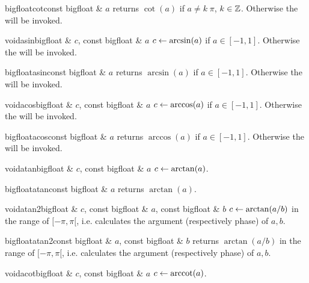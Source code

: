 \begin{fcode}{bigfloat}{cot}{const bigfloat & $a$}
  returns $\cot(a)$ if $a \neq k\;\pi$, $k \in \mathbb{Z}$.  Otherwise the \LEH will be invoked.
\end{fcode}

\begin{fcode}{void}{asin}{bigfloat & $c$, const bigfloat & $a$}
  $c \leftarrow \arcsin(a)$ if $a \in [ -1, 1 ] $.  Otherwise the \LEH will be invoked.
\end{fcode}

\begin{fcode}{bigfloat}{asin}{const bigfloat & $a$}
  returns $\arcsin(a)$ if $a \in [ -1, 1 ]$.  Otherwise the \LEH will be invoked.
\end{fcode}


\begin{fcode}{void}{acos}{bigfloat & $c$, const bigfloat & $a$}
  $c \leftarrow \arccos(a)$ if $a \in [ -1, 1 ]$.  Otherwise the \LEH will be invoked.
\end{fcode}

\begin{fcode}{bigfloat}{acos}{const bigfloat & $a$}
  returns $\arccos(a)$ if $a \in [ -1, 1 ]$.  Otherwise the \LEH will be invoked.
\end{fcode}

\begin{fcode}{void}{atan}{bigfloat & $c$, const bigfloat & $a$}
  $c \leftarrow \arctan(a)$.
\end{fcode}

\begin{fcode}{bigfloat}{atan}{const bigfloat & $a$}
  returns $\arctan(a)$.
\end{fcode}

\begin{fcode}{void}{atan2}{bigfloat & $c$, const bigfloat & $a$, const bigfloat & $b$}
  $c \leftarrow \arctan(a / b)$ in the range of $[-\pi, \pi[$, i.e. 
  calculates the argument (respectively phase) of $a, b$.
\end{fcode}

\begin{fcode}{bigfloat}{atan2}{const bigfloat & $a$, const bigfloat & $b$}
  returns $\arctan(a / b)$ in the range of $[-\pi, \pi[$, i.e.  calculates
  the argument (respectively phase) of $a, b$.
\end{fcode}

\begin{fcode}{void}{acot}{bigfloat & $c$, const bigfloat & $a$}
  $c \leftarrow \operatorname{arccot}(a)$.
\end{fcode}

